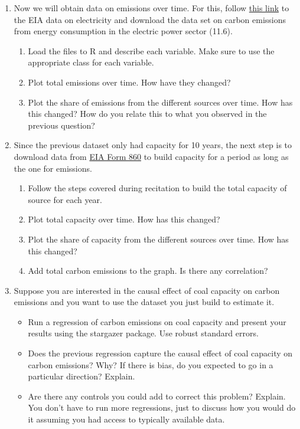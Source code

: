 \documentclass[12pt]{article}
\begin{document}
\begin{enumerate}
	\item Now we will obtain data on emissions over time. For this, follow \href{https://www.eia.gov/electricity/data.php#elecenv}{this link} to the EIA data on electricity and download the data set on carbon emissions from energy consumption in the electric power sector (11.6).
	\begin{enumerate}
	\item Load the files to R and describe each variable. Make sure to use the appropriate class for each variable.
	\item Plot total emissions over time. How have they changed?
	\item Plot the share of emissions from the different sources over time. How has this changed? How do you relate this to what you observed in the previous question?
	\end{enumerate}
\item Since the previous dataset only had capacity for 10 years, the next step is to download data from \href{https://www.eia.gov/electricity/data/eia860/}{EIA Form 860} to build capacity for a period as long as the one for emissions. 
	\begin{enumerate}
	\item  Follow the steps covered during recitation to build the total capacity of source for each year.
	\item Plot total capacity over time. How has this changed?
	\item Plot the share of capacity from the different sources over time. How has this changed?
	\item Add total carbon emissions to the graph. Is there any correlation?
	\end{enumerate}
	\item Suppose you are interested in the causal effect of coal capacity on carbon emissions and you want to use the dataset you just build to estimate it.
		\begin{itemize}
		\item Run a regression of carbon emissions on coal capacity and present your results using the stargazer package. Use robust standard errors.
		\item 	Does the previous regression capture the causal effect of coal capacity on carbon emissions? Why? If there is bias, do you expected to go in a particular direction? Explain.
		\item Are there any controls you could add to correct this problem? Explain. You don't have to run more regressions, just to discuss how you would do it assuming you had access to typically available data.
		\end{itemize}

\end{enumerate}
\end{document}
